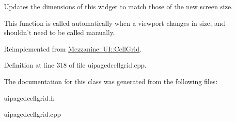 Updates the dimensions of this widget to match those of the new screen size. 

This function is called automatically when a viewport changes in size, and shouldn't need to be called manually. 

Reimplemented from \hyperlink{classMezzanine_1_1UI_1_1CellGrid_a11cda11f70cd331c9bd39daf0b0f24aa}{Mezzanine::UI::CellGrid}.



Definition at line 318 of file uipagedcellgrid.cpp.



The documentation for this class was generated from the following files:\begin{DoxyCompactItemize}
\item 
uipagedcellgrid.h\item 
uipagedcellgrid.cpp\end{DoxyCompactItemize}
